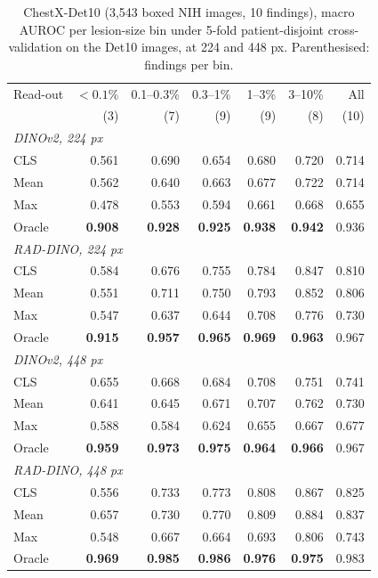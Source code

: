 \documentclass[10pt,letterpaper,twocolumn]{article}
\begin{document}
\begin{table}[t]
\centering\footnotesize\setlength{\tabcolsep}{3.5pt}
\caption{ChestX-Det10 (3,543 boxed NIH images, 10 findings), macro AUROC per lesion-size bin
under 5-fold patient-disjoint cross-validation on the Det10 images, at 224 and 448 px.
Parenthesised: findings per bin.}
\label{tab:det10}
\begin{tabular}{lrrrrrr}
\toprule
Read-out & $<0.1\%$ & 0.1--0.3\% & 0.3--1\% & 1--3\% & 3--10\% & All \\
 & (3) & (7) & (9) & (9) & (8) & (10) \\
\midrule
\multicolumn{7}{l}{\emph{DINOv2, 224 px}} \\
CLS    & 0.561 & 0.690 & 0.654 & 0.680 & 0.720 & 0.714 \\
Mean   & 0.562 & 0.640 & 0.663 & 0.677 & 0.722 & 0.714 \\
Max    & 0.478 & 0.553 & 0.594 & 0.661 & 0.668 & 0.655 \\
Oracle & \textbf{0.908} & \textbf{0.928} & \textbf{0.925} & \textbf{0.938} & \textbf{0.942} & 0.936 \\
\midrule
\multicolumn{7}{l}{\emph{RAD-DINO, 224 px}} \\
CLS    & 0.584 & 0.676 & 0.755 & 0.784 & 0.847 & 0.810 \\
Mean   & 0.551 & 0.711 & 0.750 & 0.793 & 0.852 & 0.806 \\
Max    & 0.547 & 0.637 & 0.644 & 0.708 & 0.776 & 0.730 \\
Oracle & \textbf{0.915} & \textbf{0.957} & \textbf{0.965} & \textbf{0.969} & \textbf{0.963} & 0.967 \\
\midrule
\multicolumn{7}{l}{\emph{DINOv2, 448 px}} \\
CLS    & 0.655 & 0.668 & 0.684 & 0.708 & 0.751 & 0.741 \\
Mean   & 0.641 & 0.645 & 0.671 & 0.707 & 0.762 & 0.730 \\
Max    & 0.588 & 0.584 & 0.624 & 0.655 & 0.667 & 0.677 \\
Oracle & \textbf{0.959} & \textbf{0.973} & \textbf{0.975} & \textbf{0.964} & \textbf{0.966} & 0.967 \\
\midrule
\multicolumn{7}{l}{\emph{RAD-DINO, 448 px}} \\
CLS    & 0.556 & 0.733 & 0.773 & 0.808 & 0.867 & 0.825 \\
Mean   & 0.657 & 0.730 & 0.770 & 0.809 & 0.884 & 0.837 \\
Max    & 0.548 & 0.667 & 0.664 & 0.693 & 0.806 & 0.743 \\
Oracle & \textbf{0.969} & \textbf{0.985} & \textbf{0.986} & \textbf{0.976} & \textbf{0.975} & 0.983 \\
\bottomrule
\end{tabular}
\end{table}
\end{document}
